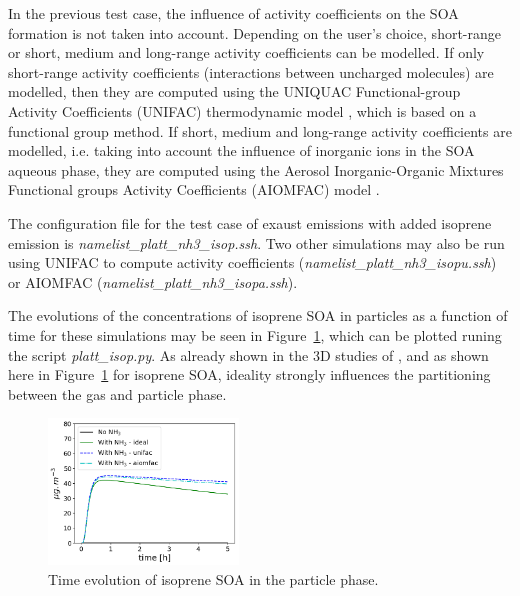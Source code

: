 \documentclass[a4paper,11pt]{article}
\begin{document}
In the previous test case, the influence of activity coefficients on the SOA formation is not taken into account. 
Depending on the user's choice, short-range or short, medium and long-range activity coefficients can be modelled. If only short-range activity coefficients (interactions between uncharged molecules) are modelled, then they are computed using the UNIQUAC Functional-group Activity Coefficients (UNIFAC) thermodynamic model \cite{Fredenslund}, 
which is based on a functional group method. If short, medium and long-range activity coefficients are modelled, i.e. taking into account the influence of inorganic ions in the SOA aqueous phase, they are computed using the Aerosol Inorganic-Organic Mixtures Functional groups Activity Coefficients (AIOMFAC) model \cite{zuend2008}. 

The configuration file for the test case of exaust emissions with added isoprene emission is {\it{namelist\_platt\_nh3\_isop.ssh}}.
Two other simulations may also be run using UNIFAC to compute activity coefficients ({\it{namelist\_platt\_nh3\_isopu.ssh}}) or AIOMFAC ({\it{namelist\_platt\_nh3\_isopa.ssh}}).

The evolutions of the concentrations of isoprene SOA in particles as a function of time for these simulations may be seen in Figure~\ref{fig-platt-isop}, which can be plotted runing the script {\it{platt\_isop.py}}.
As already shown in the 3D studies of \cite{couvidat2012, kim2019}, and as shown here in Figure~\ref{fig-platt-isop} for isoprene SOA, ideality strongly influences the partitioning between the gas and particle phase. 
\begin{figure}[H]
        \begin{center}
                \includegraphics[angle=0,width=0.45\textwidth]{../graph/figure_ref/platt-isop.png}
        \end{center}
	\caption{Time evolution of isoprene SOA in the particle phase.}
\label{fig-platt-isop}
\end{figure}
      
\end{document}
